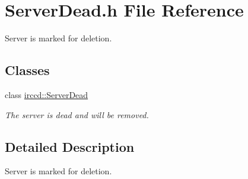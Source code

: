 \hypertarget{a00129}{\section{Server\-Dead.\-h File Reference}
\label{a00129}
}


Server is marked for deletion.  


\subsection*{Classes}
\begin{DoxyCompactItemize}
\item 
class \hyperlink{a00057}{irccd\-::\-Server\-Dead}
\begin{DoxyCompactList}\small\item\em The server is dead and will be removed. \end{DoxyCompactList}\end{DoxyCompactItemize}


\subsection{Detailed Description}
Server is marked for deletion. 